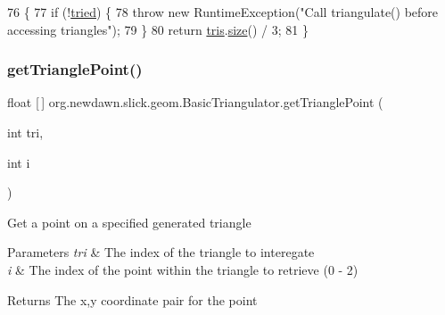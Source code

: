 \begin{DoxyCode}
76                                   \{
77         \textcolor{keywordflow}{if} (!\mbox{\hyperlink{classorg_1_1newdawn_1_1slick_1_1geom_1_1_basic_triangulator_adc09d95b55a0bca60e6d63df97735ce4}{tried}}) \{
78             \textcolor{keywordflow}{throw} \textcolor{keyword}{new} RuntimeException(\textcolor{stringliteral}{"Call triangulate() before accessing triangles"});
79         \}
80         \textcolor{keywordflow}{return} \mbox{\hyperlink{classorg_1_1newdawn_1_1slick_1_1geom_1_1_basic_triangulator_af35de217f51e551e95179a91b06c59f2}{tris}}.\mbox{\hyperlink{classorg_1_1newdawn_1_1slick_1_1geom_1_1_basic_triangulator_1_1_point_list_acc38c8b7107150c8fd3231250711cc6b}{size}}() / 3;
81     \}
\end{DoxyCode}
\mbox{\label{classorg_1_1newdawn_1_1slick_1_1geom_1_1_basic_triangulator_a107a1682eeeb57956a9b14f0d733a038}} 
\subsubsection{\texorpdfstring{get\+Triangle\+Point()}{getTrianglePoint()}}
{\footnotesize\ttfamily float \mbox{[}$\,$\mbox{]} org.\+newdawn.\+slick.\+geom.\+Basic\+Triangulator.\+get\+Triangle\+Point (\begin{DoxyParamCaption}\item[{int}]{tri,  }\item[{int}]{i }\end{DoxyParamCaption})\hspace{0.3cm}{\ttfamily [inline]}}

Get a point on a specified generated triangle


\begin{DoxyParams}{Parameters}
{\em tri} & The index of the triangle to interegate \\
\hline
{\em i} & The index of the point within the triangle to retrieve (0 -\/ 2) \\
\hline
\end{DoxyParams}
\begin{DoxyReturn}{Returns}
The x,y coordinate pair for the point 
\end{DoxyReturn}


